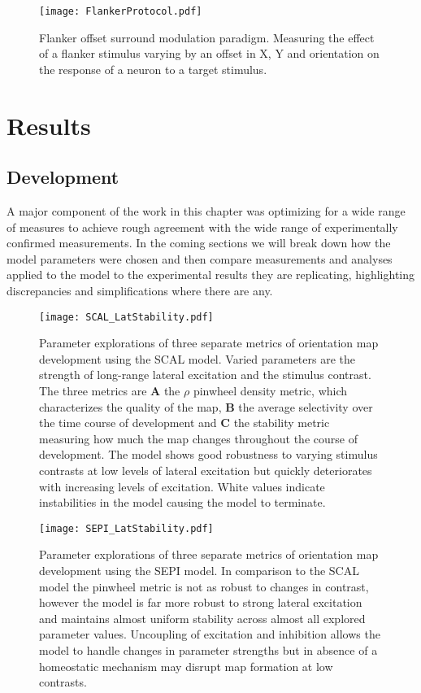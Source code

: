 \begin{figure}
	\centering
        \texttt{[image: FlankerProtocol.pdf]}
	\caption{Flanker offset surround modulation paradigm. Measuring
      the effect of a flanker stimulus varying by an offset in X, Y
      and orientation on the response of a neuron to a target
      stimulus.}
	\label{Flanker}
\end{figure}


\section{Results}

\subsection{Development}

A major component of the work in this chapter was optimizing for a
wide range of measures to achieve rough agreement with the wide range
of experimentally confirmed measurements. In the coming sections we
will break down how the model parameters were chosen and then compare
measurements and analyses applied to the model to the experimental
results they are replicating, highlighting discrepancies and
simplifications where there are any.

\begin{figure}
	\centering
        \texttt{[image: SCAL\_LatStability.pdf]}
	\caption{Parameter explorations of three separate metrics of
          orientation map development using the SCAL model. Varied
          parameters are the strength of long-range lateral excitation
          and the stimulus contrast. The three metrics are \textbf{A}
          the $\rho$ pinwheel density metric, which characterizes the
          quality of the map, \textbf{B} the average selectivity over
          the time course of development and \textbf{C} the stability
          metric measuring how much the map changes throughout the
          course of development. The model shows good robustness to
          varying stimulus contrasts at low levels of lateral
          excitation but quickly deteriorates with increasing levels
          of excitation. White values indicate instabilities in the
          model causing the model to terminate.}
	\label{SCALStability}
\end{figure}


\begin{figure}
	\centering
        \texttt{[image: SEPI\_LatStability.pdf]}
	\caption{Parameter explorations of three separate metrics of
          orientation map development using the SEPI model. In
          comparison to the SCAL model the pinwheel metric is not as
          robust to changes in contrast, however the model is far more
          robust to strong lateral excitation and maintains almost
          uniform stability across almost all explored parameter
          values. Uncoupling of excitation and inhibition allows the
          model to handle changes in parameter strengths but in
          absence of a homeostatic mechanism may disrupt map formation
          at low contrasts.}
	\label{SEPIStability}
\end{figure}


